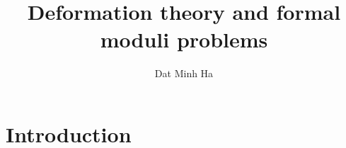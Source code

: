 

\setcounter{section}{-1}





    \title{Deformation theory and formal moduli problems}
    
    \author{Dat Minh Ha}
    \maketitle
    
    \begin{abstract}
        
    \end{abstract}
    
    {
      \hypersetup{} 
      \tableofcontents %
    }

    \section{Introduction}
    
    

    

    
    
    \printbibliography

